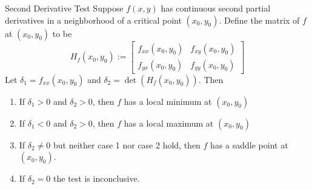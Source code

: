 \documentclass[12pt]{report}
\begin{document}
\begin{appendices}
    \begin{namthm}{Second Derivative Test}
        Suppose $f(x,y)$ has continuous second partial derivatives in a neighborhood of a critical point $(x_0,y_0)$. Define the  matrix of $f$ at $(x_0,y_0)$ to be \begin{equation}
            H_f(x_0,y_0) := \begin{bmatrix} f_{xx}(x_0,y_0) & f_{xy}(x_0,y_0) \\ f_{yx}(x_0,y_0) & f_{yy}(x_0,y_0) \end{bmatrix}
        \end{equation}
        Let $\delta_1 = f_{xx}(x_0,y_0)$ and $\delta_2 = \det(H_f(x_0,y_0))$. Then \begin{enumerate}
            \item If $\delta_1 > 0$ and $\delta_2 > 0$, then $f$ has a local minimum at $(x_0,y_0)$
            \item If $\delta_1 < 0$ and $\delta_2 > 0$, then $f$ has a local maximum at $(x_0,y_0)$
            \item If $\delta_2 \neq 0$ but neither case 1 nor case 2 hold, then $f$ has a saddle point at $(x_0,y_0)$.
            \item If $\delta_2 = 0$ the test is inconclusive.
        \end{enumerate}
    \end{namthm}
    

\end{appendices}
\end{document}
